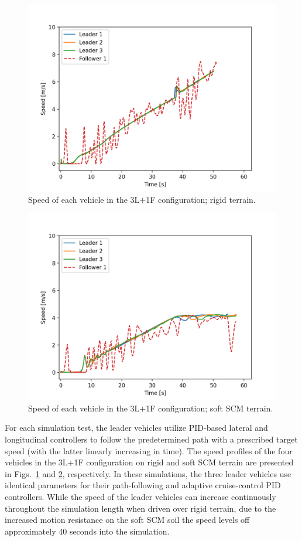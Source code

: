 \documentclass[12pt,twocolumn]{article}
\begin{document}
\begin{figure}
    \centering
    \includegraphics[width=\columnwidth]{Figs/Demonstration/3f_1i_rigid_velocities.png}
    \caption{{\small Speed of each vehicle in the 3L$ + $1F configuration; rigid terrain.}}
    \label{fig:rigid31vel}
\end{figure}
%
\begin{figure}
    \includegraphics[width=\columnwidth]{Figs/Demonstration/3f_1i_soft_velocities.png}
    \caption{{\small Speed of each vehicle in the 3L$ + $1F configuration; soft SCM terrain.}}
    \label{fig:soft31vel} 
\end{figure}
For each simulation test, the leader vehicles utilize PID-based lateral and longitudinal controllers to follow the predetermined path with a prescribed target speed (with the latter linearly increasing in time). The speed profiles of the four vehicles in the 3L+1F configuration on rigid and soft SCM terrain are presented in Figs.~\ref{fig:rigid31vel} and \ref{fig:soft31vel}, respectively.  In these simulations, the three leader vehicles use identical parameters for their path-following and adaptive cruise-control PID controllers.  While the speed of the leader vehicles can increase continuously throughout the simulation length when driven over rigid terrain, due to the increased motion resistance on the soft SCM soil the speed levels off approximately 40 seconds into the simulation.
\end{document}
